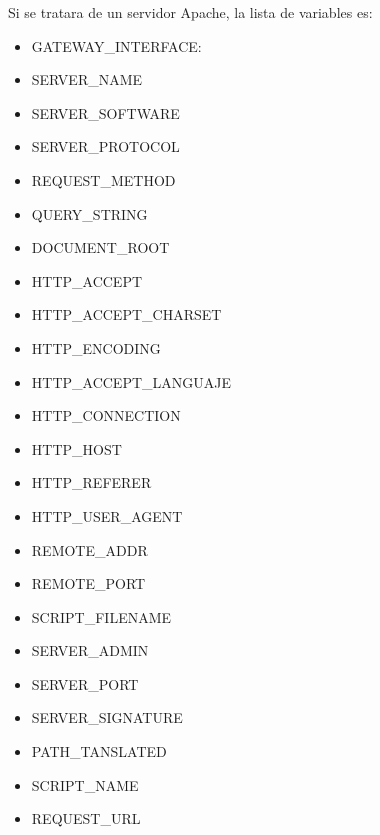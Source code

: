 \documentclass[a5paper,10pt,spanish]{sphinxmanual}
\begin{document}
Si se tratara de un servidor Apache, la lista de variables es:
\begin{itemize}
\item {} 
GATEWAY\_INTERFACE:

\item {} 
SERVER\_NAME

\item {} 
SERVER\_SOFTWARE

\item {} 
SERVER\_PROTOCOL

\item {} 
REQUEST\_METHOD

\item {} 
QUERY\_STRING

\item {} 
DOCUMENT\_ROOT

\item {} 
HTTP\_ACCEPT

\item {} 
HTTP\_ACCEPT\_CHARSET

\item {} 
HTTP\_ENCODING

\item {} 
HTTP\_ACCEPT\_LANGUAJE

\item {} 
HTTP\_CONNECTION

\item {} 
HTTP\_HOST

\item {} 
HTTP\_REFERER

\item {} 
HTTP\_USER\_AGENT

\item {} 
REMOTE\_ADDR

\item {} 
REMOTE\_PORT

\item {} 
SCRIPT\_FILENAME

\item {} 
SERVER\_ADMIN

\item {} 
SERVER\_PORT

\item {} 
SERVER\_SIGNATURE

\item {} 
PATH\_TANSLATED

\item {} 
SCRIPT\_NAME

\item {} 
REQUEST\_URL

\end{itemize}
\end{document}
